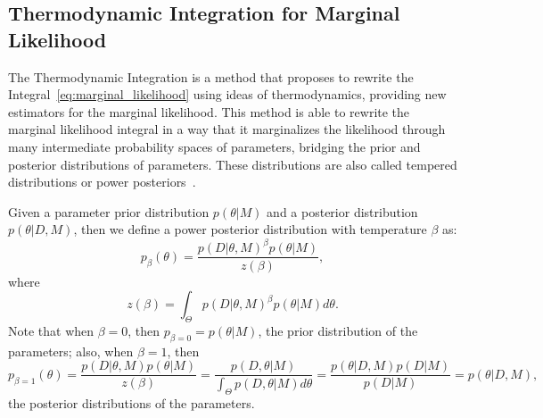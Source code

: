 \subsection{Thermodynamic Integration for Marginal Likelihood}
The Thermodynamic Integration is a method that proposes to rewrite
the Integral~\ref{eq:marginal_likelihood} using ideas of thermodynamics,
providing new estimators for the marginal likelihood. This method is
able to rewrite the marginal likelihood integral in a way that it 
marginalizes the likelihood through many intermediate probability spaces 
of parameters, bridging the prior and posterior distributions of 
parameters. These distributions are also called tempered distributions
or power posteriors~\cite{Friel2008}.

Given a parameter prior distribution $p (\theta | M)$ and a posterior 
distribution $p (\theta | D, M)$, then we define a power posterior 
distribution with temperature $\beta$ as:
\begin{equation*}
    p_{\beta} (\theta) = \frac{p (D | \theta, M)^\beta p(\theta | M)}
                              {z (\beta)},
\end{equation*}
where
\begin{equation*}
    z (\beta) = \int_\Theta p (D | \theta, M)^\beta p(\theta | M) 
            d\theta.
\end{equation*}
Note that when $\beta = 0$, then $p_{\beta=0} = p (\theta | M)$, the 
prior distribution of the parameters; also, when $\beta = 1$, then
\begin{equation*}
    p_{\beta=1}(\theta) = \frac{p (D | \theta, M) p(\theta | M)}
                         {z (\beta)}
                        =\frac{p (D, \theta|M)}
                              {\int_\Theta p (D, \theta | M)d\theta}
                        =\frac{p(\theta | D, M) p(D|M)}{p (D | M)}
                        =p (\theta | D, M),
\end{equation*}
the posterior distributions of the parameters.

